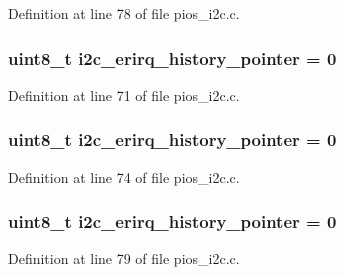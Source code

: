Definition at line 78 of file pios\-\_\-i2c.\-c.

\hypertarget{group___p_i_o_s___i2_c_ga0593115613cf2d368fe6dbe7b4e5dcff}{
\subsubsection[{i2c\-\_\-erirq\-\_\-history\-\_\-pointer}]{ {\bf uint8\-\_\-t} i2c\-\_\-erirq\-\_\-history\-\_\-pointer = 0}}\label{group___p_i_o_s___i2_c_ga0593115613cf2d368fe6dbe7b4e5dcff}


Definition at line 71 of file pios\-\_\-i2c.\-c.

\hypertarget{group___p_i_o_s___i2_c_ga0593115613cf2d368fe6dbe7b4e5dcff}{
\subsubsection[{i2c\-\_\-erirq\-\_\-history\-\_\-pointer}]{ {\bf uint8\-\_\-t} i2c\-\_\-erirq\-\_\-history\-\_\-pointer = 0}}\label{group___p_i_o_s___i2_c_ga0593115613cf2d368fe6dbe7b4e5dcff}


Definition at line 74 of file pios\-\_\-i2c.\-c.

\hypertarget{group___p_i_o_s___i2_c_ga0593115613cf2d368fe6dbe7b4e5dcff}{
\subsubsection[{i2c\-\_\-erirq\-\_\-history\-\_\-pointer}]{ {\bf uint8\-\_\-t} i2c\-\_\-erirq\-\_\-history\-\_\-pointer = 0}}\label{group___p_i_o_s___i2_c_ga0593115613cf2d368fe6dbe7b4e5dcff}


Definition at line 79 of file pios\-\_\-i2c.\-c.

